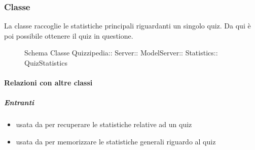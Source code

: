 \subsubsection{Classe }
La classe raccoglie le statistiche principali riguardanti un singolo quiz. Da qui è poi possibile ottenere il quiz in questione.
\begin{figure}[H]
\centering
\noindent{}
\caption[Schema Classe QuizStatistics]{Schema Classe Quizzipedia:: Server:: ModelServer:: Statistics:: QuizStatistics}
\end{figure}
\paragraph{Relazioni con altre classi}
\subparagraph{Entranti}
\begin{itemize}
\item usata da  per recuperare le statistiche relative ad un quiz
\item usata da  per memorizzare le statistiche generali riguardo al quiz
\end{itemize}
